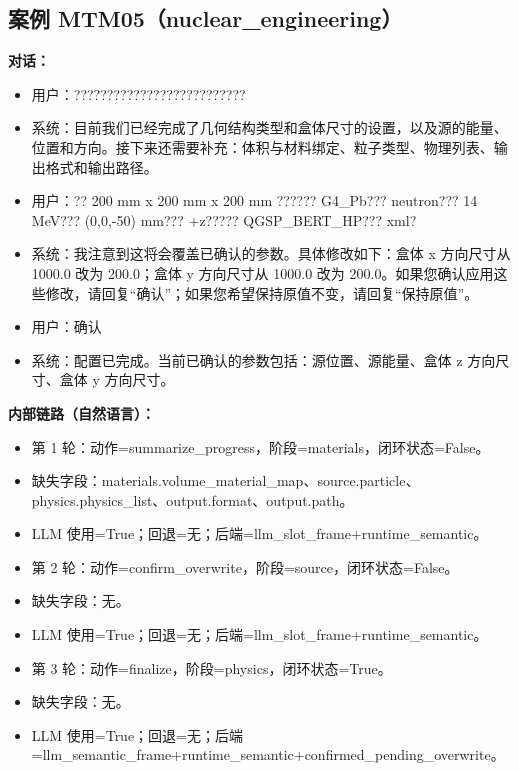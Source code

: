 \documentclass[11pt]{ctexart}
\begin{document}
\subsection{案例 MTM05（nuclear\_engineering）}
\textbf{对话：}
\begin{itemize}
\item 用户：??????????????????????????
\item 系统：目前我们已经完成了几何结构类型和盒体尺寸的设置，以及源的能量、位置和方向。接下来还需要补充：体积与材料绑定、粒子类型、物理列表、输出格式和输出路径。
\item 用户：?? 200 mm x 200 mm x 200 mm ?????? G4\_Pb??? neutron??? 14 MeV??? (0,0,-50) mm??? +z????? QGSP\_BERT\_HP??? xml?
\item 系统：我注意到这将会覆盖已确认的参数。具体修改如下：盒体 x 方向尺寸从 1000.0 改为 200.0；盒体 y 方向尺寸从 1000.0 改为 200.0。如果您确认应用这些修改，请回复“确认”；如果您希望保持原值不变，请回复“保持原值”。
\item 用户：确认
\item 系统：配置已完成。当前已确认的参数包括：源位置、源能量、盒体 z 方向尺寸、盒体 y 方向尺寸。
\end{itemize}
\textbf{内部链路（自然语言）：}
\begin{itemize}
\item 第 1 轮：动作=summarize\_progress，阶段=materials，闭环状态=False。
\item 缺失字段：materials.volume\_material\_map、source.particle、physics.physics\_list、output.format、output.path。
\item LLM 使用=True；回退=无；后端=llm\_slot\_frame+runtime\_semantic。
\item 第 2 轮：动作=confirm\_overwrite，阶段=source，闭环状态=False。
\item 缺失字段：无。
\item LLM 使用=True；回退=无；后端=llm\_slot\_frame+runtime\_semantic。
\item 第 3 轮：动作=finalize，阶段=physics，闭环状态=True。
\item 缺失字段：无。
\item LLM 使用=True；回退=无；后端=llm\_semantic\_frame+runtime\_semantic+confirmed\_pending\_overwrite。
\end{itemize}
\end{document}
